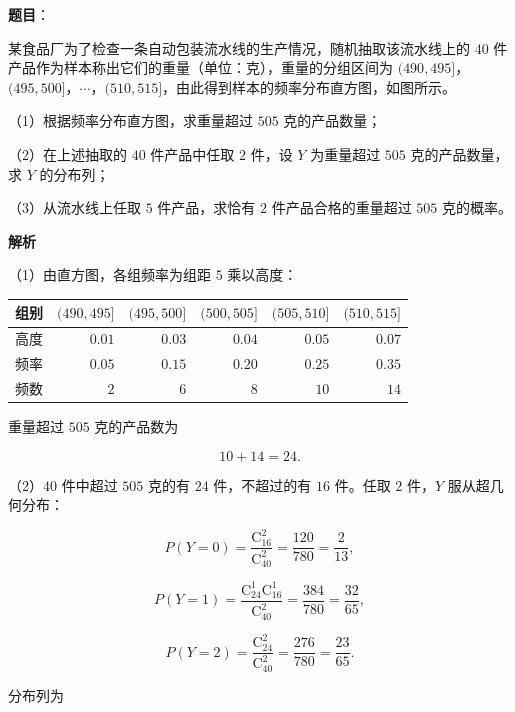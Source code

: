 \begin{answer}

\textbf{题目}：

某食品厂为了检查一条自动包装流水线的生产情况，随机抽取该流水线上的 $40$ 件产品作为样本称出它们的重量（单位：克），重量的分组区间为 $(490,495]$，$(495,500]$，$\cdots$，$(510,515]$，由此得到样本的频率分布直方图，如图所示。
\nopagebreak[4]
\begin{center}\end{center}
\nopagebreak[4]
（1）根据频率分布直方图，求重量超过 $505$ 克的产品数量；

（2）在上述抽取的 $40$ 件产品中任取 $2$ 件，设 $Y$ 为重量超过 $505$ 克的产品数量，求 $Y$ 的分布列；

（3）从流水线上任取 $5$ 件产品，求恰有 $2$ 件产品合格的重量超过 $505$ 克的概率。

\textbf{解析}

（1）由直方图，各组频率为组距 $5$ 乘以高度：

\begin{center}
\begin{tabular}{lrrrrr}
\toprule
组别 & $(490,495]$ & $(495,500]$ & $(500,505]$ & $(505,510]$ & $(510,515]$ \\
\midrule
高度 & $0.01$ & $0.03$ & $0.04$ & $0.05$ & $0.07$ \\
频率 & $0.05$ & $0.15$ & $0.20$ & $0.25$ & $0.35$ \\
频数 & $2$ & $6$ & $8$ & $10$ & $14$ \\
\bottomrule
\end{tabular}
\end{center}

重量超过 $505$ 克的产品数为

\nopagebreak[4]
\[10+14=24.\]

（2）$40$ 件中超过 $505$ 克的有 $24$ 件，不超过的有 $16$ 件。任取 $2$ 件，$Y$ 服从超几何分布：

\nopagebreak[4]
\[P(Y=0)=\frac{\mathrm C_{16}^2}{\mathrm C_{40}^2}
=\frac{120}{780}=\frac2{13},\]

\nopagebreak[4]
\[P(Y=1)=\frac{\mathrm C_{24}^1\mathrm C_{16}^1}{\mathrm C_{40}^2}
=\frac{384}{780}=\frac{32}{65},\]

\nopagebreak[4]
\[P(Y=2)=\frac{\mathrm C_{24}^2}{\mathrm C_{40}^2}
=\frac{276}{780}=\frac{23}{65}.\]

分布列为


\end{answer}
